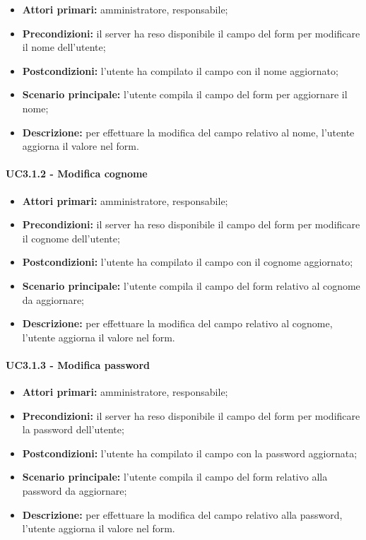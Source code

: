 \begin{itemize}
	\item 	\textbf{Attori primari:} amministratore, responsabile;
	\item 	\textbf{Precondizioni:} il server ha reso disponibile il campo del form per modificare il nome dell'utente;
	\item 	\textbf{Postcondizioni:}  l'utente ha compilato il campo con il nome aggiornato;
	\item 	\textbf{Scenario principale:} l'utente compila il campo del form per aggiornare il nome;
	\item 	\textbf{Descrizione:} per effettuare la modifica del campo relativo al nome, l'utente aggiorna il valore nel form.
\end{itemize}

\paragraph{UC3.1.2 - Modifica cognome}

\begin{itemize}
	\item 	\textbf{Attori primari:} amministratore, responsabile;
	\item 	\textbf{Precondizioni:} il server ha reso disponibile il campo del form per modificare il cognome dell'utente;
	\item 	\textbf{Postcondizioni:} l'utente ha compilato il campo con il cognome aggiornato;
	\item 	\textbf{Scenario principale:} l'utente compila il campo del form relativo al cognome da aggiornare;
	\item 	\textbf{Descrizione:} per effettuare la modifica del campo relativo al cognome, l'utente aggiorna il valore nel form.

\end{itemize}

\paragraph{UC3.1.3 - Modifica password}

\begin{itemize}
	\item 	\textbf{Attori primari:} amministratore, responsabile;
	\item 	\textbf{Precondizioni:} il server ha reso disponibile il campo del form per modificare la password dell'utente;
	\item 	\textbf{Postcondizioni:} l'utente ha compilato il campo con la password aggiornata;
	\item 	\textbf{Scenario principale:} l'utente compila il campo del form relativo alla password da aggiornare;
	\item 	\textbf{Descrizione:} per effettuare la modifica del campo relativo alla password, l'utente aggiorna il valore nel form.

\end{itemize}


